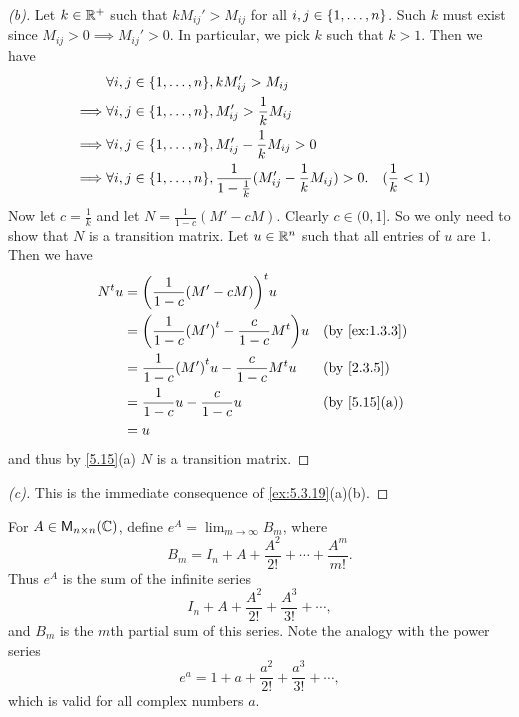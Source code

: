 \begin{proof}[(b)]
	Let \(k \in \mathbb{R}^+\) such that \(k M_{i j}' > M_{i j}\) for all \(i, j \in \left\lbrace1, \dots, n\right\rbrace\).
	Such \(k\) must exist since \(M_{i j} > 0 \implies M_{i j}' > 0\).
	In particular, we pick \(k\) such that \(k > 1\).
	Then we have
	\begin{align*}
		         & \forall i, j \in \set{1, \dots, n}, k M_{i j}' > M_{i j}                                                                   \\
		\implies & \forall i, j \in \set{1, \dots, n}, M_{i j}' > \frac{1}{k} M_{i j}                                                         \\
		\implies & \forall i, j \in \set{1, \dots, n}, M_{i j}' - \frac{1}{k} M_{i j} > 0                                                     \\
		\implies & \forall i, j \in \set{1, \dots, n}, \frac{1}{1 - \frac{1}{k}} (M_{i j}' - \frac{1}{k} M_{i j}) > 0. &  & (\frac{1}{k} < 1)
	\end{align*}
	Now let \(c = \frac{1}{k}\) and let \(N = \frac{1}{1 - c} (M' - cM)\).
	Clearly \(c \in (0, 1]\).
	So we only need to show that \(N\) is a transition matrix.
	Let \(u \in \mathbb{R}^n\) such that all entries of \(u\) are \(1\).
	Then we have
	\begin{align*}
		\tp{N} u & = \tp{\pa{\frac{1}{1 - c} (M' - cM)}} u                                        \\
		         & = \pa{\frac{1}{1 - c} \tp{(M')} - \frac{c}{1 - c} \tp{M}} u &  & \by{ex:1.3.3} \\
		         & = \frac{1}{1 - c} \tp{(M')} u - \frac{c}{1 - c} \tp{M} u    &  & \by{2.3.5}    \\
		         & = \frac{1}{1 - c} u - \frac{c}{1 - c} u                     &  & \by{5.15}[a]  \\
		         & = u
	\end{align*}
	and thus by \cref{5.15}(a) \(N\) is a transition matrix.
\end{proof}

\begin{proof}[(c)]
	This is the immediate consequence of \cref{ex:5.3.19}(a)(b).
\end{proof}

\begin{defn}\label{5.3.18}
	For \(A \in \ms[n][n][\C]\), define \(e^A = \lim_{m \to \infty} B_m\), where
	\[
		B_m = I_n + A + \frac{A^2}{2!} + \cdots + \frac{A^m}{m!}.
	\]
	Thus \(e^A\) is the sum of the infinite series
	\[
		I_n + A + \frac{A^2}{2!} + \frac{A^3}{3!} + \cdots,
	\]
	and \(B_m\) is the \(m\)th partial sum of this series.
	Note the analogy with the power series
	\[
		e^a = 1 + a + \frac{a^2}{2!} + \frac{a^3}{3!} + \cdots,
	\]
	which is valid for all complex numbers \(a\).
\end{defn}

